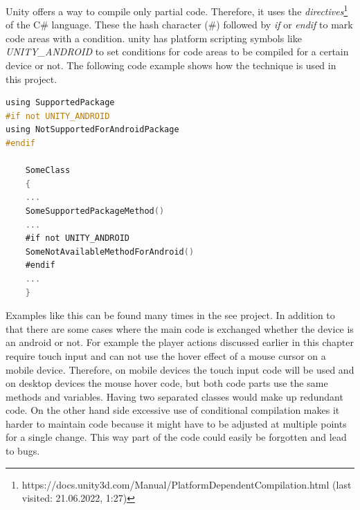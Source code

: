 Unity offers a way to compile only partial code. 
Therefore, it uses the \textit{directives}\footnote{https://docs.unity3d.com/Manual/PlatformDependentCompilation.html (last visited: 21.06.2022, 1:27)} of the C\# language. 
These the hash character (\#) followed by \textit{if} or \textit{endif} to mark code areas with a condition.
\gls{unity} has platform scripting symbols like \textit{UNITY\_ANDROID} to set conditions for code areas to be compiled for a certain device or not.
The following code example shows how the technique is used in this project. 

\begin{minipage}{\linewidth}

\begin{lstlisting}[language=C]
using SupportedPackage
#if not UNITY_ANDROID
using NotSupportedForAndroidPackage
#endif 

    SomeClass
    {
    ...
    SomeSupportedPackageMethod()
    ...
    #if not UNITY_ANDROID
    SomeNotAvailableMethodForAndroid()
    #endif
    ...
    }
\end{lstlisting}

\end{minipage}

Examples like this can be found many times in the \gls{see} project. 
In addition to that there are some cases where the main code is exchanged whether the device is an \gls{android} or not.
For example the player actions discussed earlier in this chapter require touch input and can not use the hover effect of a mouse cursor on a mobile device.
Therefore, on mobile devices the touch input code will be used and on desktop devices the mouse hover code, but both code parts use the same methods and variables.
Having two separated classes would make up redundant code. 
On the other hand side excessive use of conditional compilation makes it harder to maintain code because it might have to be adjusted at multiple points for a single change.
This way part of the code could easily be forgotten and lead to bugs.

